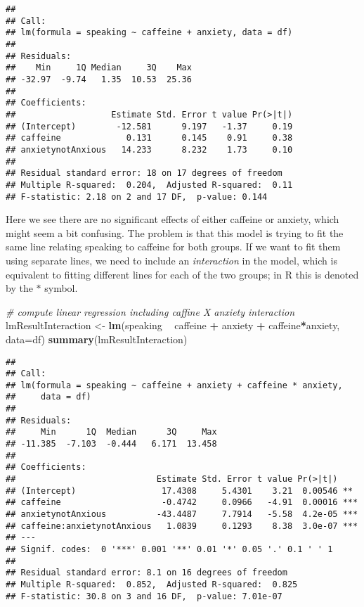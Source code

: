 \documentclass[]{book}
\newenvironment{Shaded}{\begin{snugshade}}{\end{snugshade}}
\newcommand{\KeywordTok}[1]{\textcolor[rgb]{0.13,0.29,0.53}{\textbf{#1}}}
\newcommand{\DataTypeTok}[1]{\textcolor[rgb]{0.13,0.29,0.53}{#1}}
\newcommand{\StringTok}[1]{\textcolor[rgb]{0.31,0.60,0.02}{#1}}
\newcommand{\CommentTok}[1]{\textcolor[rgb]{0.56,0.35,0.01}{\textit{#1}}}
\newcommand{\OperatorTok}[1]{\textcolor[rgb]{0.81,0.36,0.00}{\textbf{#1}}}
\newcommand{\NormalTok}[1]{#1}
\theoremstyle{definition}
\theoremstyle{definition}
\theoremstyle{definition}
\theoremstyle{remark}
\begin{document}
\begin{verbatim}
## 
## Call:
## lm(formula = speaking ~ caffeine + anxiety, data = df)
## 
## Residuals:
##    Min     1Q Median     3Q    Max 
## -32.97  -9.74   1.35  10.53  25.36 
## 
## Coefficients:
##                   Estimate Std. Error t value Pr(>|t|)
## (Intercept)        -12.581      9.197   -1.37     0.19
## caffeine             0.131      0.145    0.91     0.38
## anxietynotAnxious   14.233      8.232    1.73     0.10
## 
## Residual standard error: 18 on 17 degrees of freedom
## Multiple R-squared:  0.204,  Adjusted R-squared:  0.11 
## F-statistic: 2.18 on 2 and 17 DF,  p-value: 0.144
\end{verbatim}

Here we see there are no significant effects of either caffeine or
anxiety, which might seem a bit confusing. The problem is that this
model is trying to fit the same line relating speaking to caffeine for
both groups. If we want to fit them using separate lines, we need to
include an \emph{interaction} in the model, which is equivalent to
fitting different lines for each of the two groups; in R this is denoted
by the \(*\) symbol.

\begin{Shaded}
\begin{Highlighting}[]
\CommentTok{# compute linear regression including caffine X anxiety interaction}
\NormalTok{lmResultInteraction <-}\StringTok{ }\KeywordTok{lm}\NormalTok{(speaking }\OperatorTok{~}\StringTok{ }\NormalTok{caffeine }\OperatorTok{+}\StringTok{ }\NormalTok{anxiety }\OperatorTok{+}\StringTok{ }\NormalTok{caffeine}\OperatorTok{*}\NormalTok{anxiety,}
                          \DataTypeTok{data=}\NormalTok{df)}
\KeywordTok{summary}\NormalTok{(lmResultInteraction)}
\end{Highlighting}
\end{Shaded}

\begin{verbatim}
## 
## Call:
## lm(formula = speaking ~ caffeine + anxiety + caffeine * anxiety, 
##     data = df)
## 
## Residuals:
##     Min      1Q  Median      3Q     Max 
## -11.385  -7.103  -0.444   6.171  13.458 
## 
## Coefficients:
##                            Estimate Std. Error t value Pr(>|t|)    
## (Intercept)                 17.4308     5.4301    3.21  0.00546 ** 
## caffeine                    -0.4742     0.0966   -4.91  0.00016 ***
## anxietynotAnxious          -43.4487     7.7914   -5.58  4.2e-05 ***
## caffeine:anxietynotAnxious   1.0839     0.1293    8.38  3.0e-07 ***
## ---
## Signif. codes:  0 '***' 0.001 '**' 0.01 '*' 0.05 '.' 0.1 ' ' 1
## 
## Residual standard error: 8.1 on 16 degrees of freedom
## Multiple R-squared:  0.852,  Adjusted R-squared:  0.825 
## F-statistic: 30.8 on 3 and 16 DF,  p-value: 7.01e-07
\end{verbatim}
\end{document}
